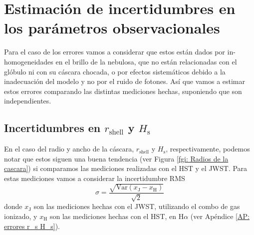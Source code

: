 \documentclass{book}
\begin{document}
\section[Errores observacionales]{Estimación de incertidumbres en los parámetros observacionales}

Para el caso de los errores vamos a considerar que estos están dados
por in-homogeneidades en el brillo de la nebulosa, que no están
relacionadas con el glóbulo ni con su cáscara chocada, o por efectos
sistemáticos debido a la inadecuación del modelo y no por el ruido de
fotones. Así que vamos a estimar estos errores comparando las
distintas mediciones hechas, suponiendo que son independientes.

\subsection{\boldmath Incertidumbres en $r_\mathrm{shell}$ y $H_\mathrm{s}$}
\label{sec:error-shell}
En el caso del radio y ancho de la cáscara, $r_\mathrm{shell}$ y
$H_\mathrm{s}$, respectivamente, podemos notar que estos siguen una
buena tendencia (ver Figura \ref{fgi: Radios de la cascara}) si
comparamos las mediciones realizadas con el HST y el JWST. Para estas
mediciones vamos a considerar la incertidumbre RMS
\begin{equation}
    \sigma=\frac{\sqrt{\mathrm{Var}(x_\mathrm{J}-x_\mathrm{H})}}{\sqrt{2}}
\end{equation}
donde $x_\mathrm{J}$ son las mediciones hechas con el JWST, utilizando
el combo de gas ionizado, y $x_\mathrm{H}$ son las mediciones hechas
con el HST, en H$\alpha$ (ver Apéndice \ref{AP: errores r_s H_s}).
\end{document}
